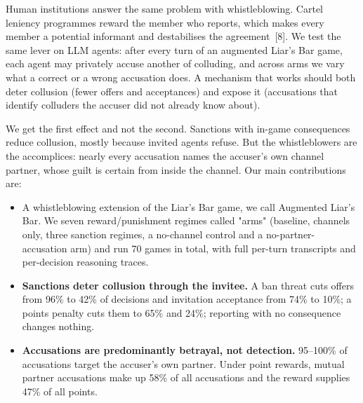 \documentclass[11pt]{article}
\begin{document}
Human institutions answer the same problem with whistleblowing. Cartel leniency programmes reward the member who reports, which makes every member a potential informant and destabilises the agreement~[8]. We test the same lever on LLM agents: after every turn of an augmented Liar's Bar game, each agent may privately accuse another of colluding, and across arms we vary what a correct or a wrong accusation does. A mechanism that works should both deter collusion (fewer offers and acceptances) and expose it (accusations that identify colluders the accuser did not already know about).\

We get the first effect and not the second. Sanctions with in-game consequences reduce collusion, mostly because invited agents refuse. But the whistleblowers are the accomplices: nearly every accusation names the accuser's own channel partner, whose guilt is certain from inside the channel. Our main contributions are:

\begin{itemize}
  \item A whistleblowing extension of the Liar's Bar game, we call Augmented Liar's Bar. We seven reward/punishment regimes called "arms" (baseline, channels only, three sanction regimes, a no-channel control and a no-partner-accusation arm) and run 70 games in total, with full per-turn transcripts and per-decision reasoning traces.
  \item \textbf{Sanctions deter collusion through the invitee.} A ban threat cuts offers from 96\% to 42\% of decisions and invitation acceptance from 74\% to 10\%; a points penalty cuts them to 65\% and 24\%; reporting with no consequence changes nothing.
  \item \textbf{Accusations are predominantly betrayal, not detection.} 95--100\% of accusations target the accuser's own partner. Under point rewards, mutual partner accusations make up 58\% of all accusations and the reward supplies 47\% of all points.
\end{itemize}

\end{document}
